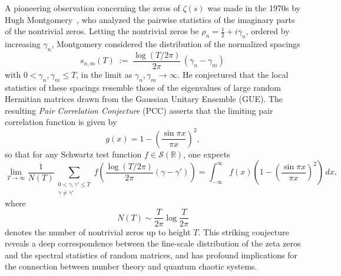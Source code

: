 \documentclass[12pt,reqno]{amsart}
\theoremstyle{plain}
\theoremstyle{definition}
\theoremstyle{remark}
\begin{document}
A pioneering observation concerning the zeros of \( \zeta(s) \) was made in the 1970s by Hugh Montgomery~\cite{M}, who analyzed the pairwise statistics of the imaginary parts of the nontrivial zeros. Letting the nontrivial zeros be \( \rho_n = \frac{1}{2} + i \gamma_n \), ordered by increasing \( \gamma_n \), Montgomery considered the distribution of the normalized spacings
\begin{equation}
s_{n,m}(T) \;:=\; \frac{\log (T/2\pi)}{2\pi}\,(\gamma_n-\gamma_m)\,
\end{equation}
with $0<\gamma_n,\gamma_m\le T$, in the limit as \( \gamma_n, \gamma_m \to \infty \). He conjectured that the local statistics of these spacings resemble those of the eigenvalues of large random Hermitian matrices drawn from the Gaussian Unitary Ensemble (GUE). The resulting \emph{Pair Correlation Conjecture} (PCC) asserts that the limiting pair correlation function is given by
\begin{equation}
\label{eq:sine}
g(x) = 1 - \left( \frac{\sin \pi x}{\pi x} \right)^2,
\end{equation}
so that for any Schwartz test function \( f \in \mathcal{S}(\mathbb{R}) \), one expects
\begin{equation}
\lim_{T \to \infty} \frac{1}{N(T)} \sum_{\substack{0 < \gamma, \gamma' \le T \\ \gamma \ne \gamma'}} f\left( \frac{\log (T/2\pi)}{2\pi} (\gamma - \gamma') \right)
= \int_{-\infty}^{\infty} f(x) \left ( 1 - \left( \frac{\sin \pi x}{\pi x} \right)^2 \right ) \, dx,
\end{equation}
where
\begin{equation}
N(T) \sim \frac{T}{2\pi} \log \frac{T}{2\pi}
\end{equation}
denotes the number of nontrivial zeros up to height \( T \). This striking conjecture reveals a deep correspondence between the fine-scale distribution of the zeta zeros and the spectral statistics of random matrices, and has profound implications for the connection between number theory and quantum chaotic systems.
\end{document}

